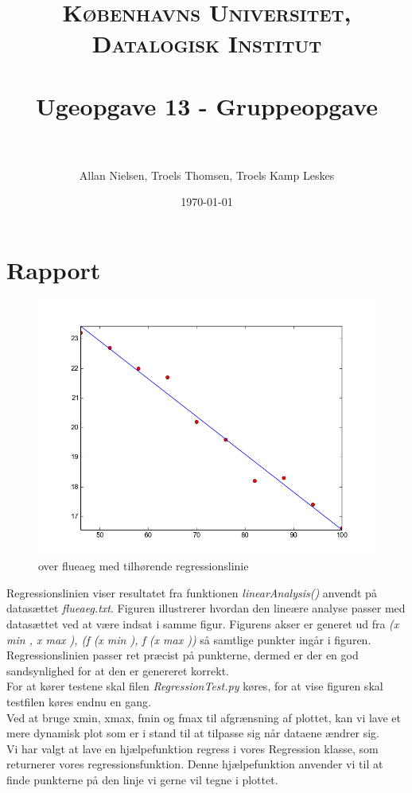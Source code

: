 \documentclass[paper=a4, fontsize=11pt]{scrartcl} %
\title{	
\normalfont \normalsize 
\textsc{Københavns Universitet, Datalogisk Institut} \\ [25pt] %
\horrule{0.5pt} \\[0.4cm] %
\huge Ugeopgave 13 - Gruppeopgave \\ %
\horrule{2pt} \\[0.5cm] %
}
\author{Allan Nielsen, Troels Thomsen, Troels Kamp Leskes} %
\date{\normalsize\today} %
\numberwithin{equation}{section} %
\numberwithin{figure}{section} %
\numberwithin{table}{section} %
\begin{document}
\maketitle %

\section*{Rapport}

\begin{figure}[h!]
  \centering
    \includegraphics[width=.8\textwidth]{figure_1}
  \caption{over flueaeg med tilhørende regressionslinie}
\end{figure}
\pagebreak

Regressionslinien viser resultatet fra funktionen \textit{linearAnalysis()} anvendt på datasættet \textit{flueaeg.txt}. Figuren illustrerer hvordan den lineære analyse passer med datasættet ved at være indsat i samme figur. Figurens akser er generet ud fra \textit{(x min , x max ), (f (x min ), f (x max ))}
så samtlige punkter ingår i figuren. Regressionslinien passer ret præcist på punkterne, dermed er der en god sandsynlighed for at den er genereret korrekt. \\
For at kører testene skal filen \textit{RegressionTest.py} køres, for at vise figuren skal testfilen køres endnu en gang.\\

Ved at bruge xmin, xmax, fmin og fmax til afgrænsning af plottet, kan vi lave et mere dynamisk plot som er i stand til at tilpasse sig når dataene ændrer sig.\\

Vi har valgt at lave en hjælpefunktion regress i vores Regression klasse, som returnerer vores regressionsfunktion. Denne hjælpefunktion anvender vi til at finde punkterne på den linje vi gerne vil tegne i plottet.
\end{document}
